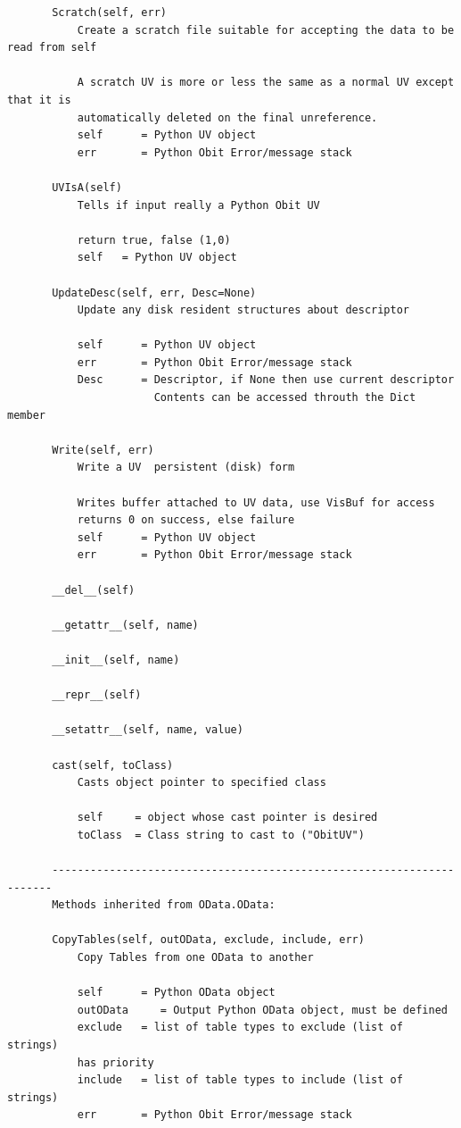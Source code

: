 \documentclass[11pt]{report}
\begin{document}
\begin{verbatim}
       Scratch(self, err)
           Create a scratch file suitable for accepting the data to be read from self
           
           A scratch UV is more or less the same as a normal UV except that it is
           automatically deleted on the final unreference.
           self      = Python UV object
           err       = Python Obit Error/message stack
       
       UVIsA(self)
           Tells if input really a Python Obit UV
           
           return true, false (1,0)
           self   = Python UV object
       
       UpdateDesc(self, err, Desc=None)
           Update any disk resident structures about descriptor
           
           self      = Python UV object
           err       = Python Obit Error/message stack
           Desc      = Descriptor, if None then use current descriptor
                       Contents can be accessed throuth the Dict member
       
       Write(self, err)
           Write a UV  persistent (disk) form
           
           Writes buffer attached to UV data, use VisBuf for access
           returns 0 on success, else failure
           self      = Python UV object
           err       = Python Obit Error/message stack
       
       __del__(self)
       
       __getattr__(self, name)
       
       __init__(self, name)
       
       __repr__(self)
       
       __setattr__(self, name, value)
       
       cast(self, toClass)
           Casts object pointer to specified class
           
           self     = object whose cast pointer is desired
           toClass  = Class string to cast to ("ObitUV")
       
       ----------------------------------------------------------------------
       Methods inherited from OData.OData:
       
       CopyTables(self, outOData, exclude, include, err)
           Copy Tables from one OData to another
           
           self      = Python OData object
           outOData     = Output Python OData object, must be defined
           exclude   = list of table types to exclude (list of strings)
           has priority
           include   = list of table types to include (list of strings)
           err       = Python Obit Error/message stack
       

\end{verbatim}
\end{document}
